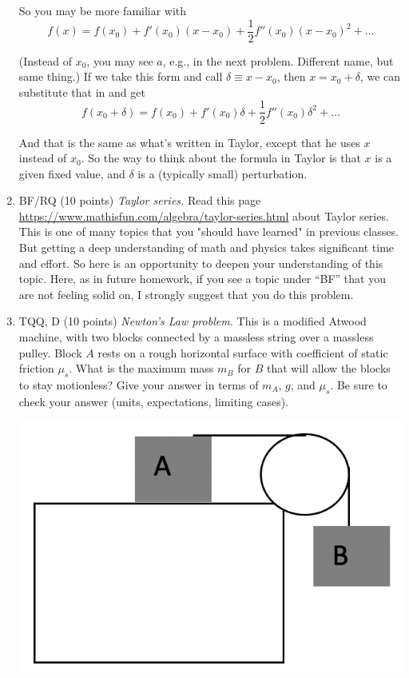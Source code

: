 \documentclass[12pt]{article}
\newcommand{\soln}[1] {\textit{Solution:} #1}
\renewcommand{\soln}[1] {}
\begin{document}
\begin{enumerate}
{So you may be more familiar with
$$f(x) = f(x_0) + f'(x_0)(x-x_0) + \frac{1}{2} f''(x_0) (x-x_0)^2 + \ldots$$

(Instead of $x_0$, you may see $a$, e.g., in the next problem. Different name, but same thing.) If we take this form and call $\delta \equiv x-x_0$, then $x = x_0 + \delta$, we can substitute that in and get
$$f(x_0 + \delta) = f(x_0) + f'(x_0)\delta + \frac{1}{2} f''(x_0)\delta^2 + \ldots$$

And that is the same as what's written in Taylor, except that he uses $x$ instead of $x_0$. So the way to think about the formula in Taylor is that $x$ is a given fixed value, and $\delta$ is a (typically small) perturbation.
}

\item BF/RQ (10 points) \textit{Taylor series.} Read this page \url{https://www.mathisfun.com/algebra/taylor-series.html} about Taylor series. This is one of many topics that you "should have learned" in previous classes. But getting a deep understanding of math and physics takes significant time and effort. So here is an opportunity to deepen your understanding of this topic.  Here, as in future homework, if you see a topic under “BF” that you are not feeling solid on, I strongly suggest that you do this problem.

\soln{Not a lot to do here. The sigma calculator gives $7.389056098930604$.}

\item	TQQ, D (10 points) \textit{Newton's Law problem.}  This is a modified Atwood machine, with two blocks connected by a massless string over a massless pulley.  Block $A$ rests on a rough horizontal surface with coefficient of static friction $\mu_s$.  What is the maximum mass $m_B$ for $B$ that will allow the blocks to stay motionless?  Give your answer in terms of $m_A$, $g$, and $\mu_s$.  Be sure to check your answer (units, expectations, limiting cases).

\centerline{\includegraphics[width=.3\textwidth]{modified_atwood.png}}

\soln{

Since nothing actually moves here, the choice of coordinate system doesn't really matter (acceleration is zero in any direction).

}
\end{enumerate}
\end{document}
